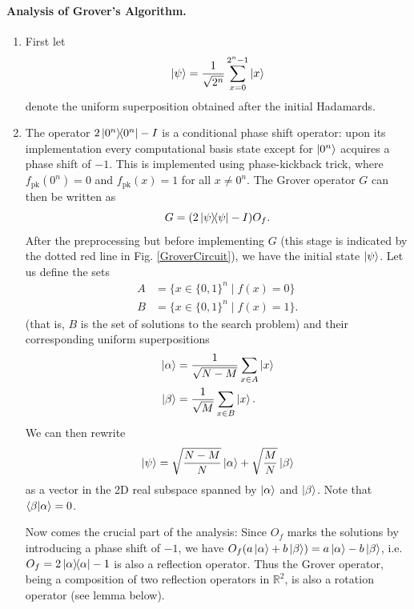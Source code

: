 \paragraph{Analysis of Grover's Algorithm.} 

\begin{enumerate}
    \item First let
    \[
        \ket{\psi}=\frac{1}{\sqrt{2^n}}\sum_{x=0}^{2^n-1}\ket{x}
    \]
    denote the uniform superposition obtained after the initial Hadamards.
    
    \item The operator $2\ketbra{0^n}{0^n}-I$ is a conditional phase shift operator: upon its implementation every computational basis state except for $\ket{0^n}$ acquires a phase shift of $-1$. This is implemented using phase-kickback trick, where $f_{\text{pk}}(0^n)=0$ and $f_{\text{pk}}(x)=1$ for all $x \neq 0^n$. The Grover operator $G$ can then be written as
    \[
        G = (2\ketbra{\psi}{\psi}-I)O_f.
    \]
    After the preprocessing but before implementing $G$ (this stage is indicated by the dotted red line in Fig. \ref{GroverCircuit}), we have the initial state $\ket{\psi}$. Let us define the sets 
    \begin{align*}
        A &= \{x \in \{0,1\}^n \;|\; f(x)=0\}\\
        B &= \{x \in \{0,1\}^n \;|\; f(x)=1\}.
    \end{align*}
    (that is, $B$ is the set of solutions to the search problem) and their corresponding uniform superpositions
    \begin{align*}
        \ket{\alpha} &= \frac{1}{\sqrt{N-M}} \sum_{x \in A} \ket{x}\\
        \ket{\beta} &= \frac{1}{\sqrt{M}} \sum_{x \in B} \ket{x}.
    \end{align*}
    We can then rewrite
    \[
        \ket{\psi} = \sqrt{\frac{N-M}{N}}\ket{\alpha} + \sqrt{\frac{M}{N}}\ket{\beta}  
    \]
    as a vector in the 2D real subspace spanned by $\ket{\alpha}$ and $\ket{\beta}$. Note that $\braket{\beta}{\alpha}=0$. 
    
    Now comes the crucial part of the analysis: Since $O_f$ marks the solutions by introducing a phase shift of $-1$, we have $O_f(a\ket{\alpha}+b\ket{\beta}) = a\ket{\alpha}-b\ket{\beta}$, i.e. $O_f = 2\ketbra{\alpha}{\alpha}-1$ is also a reflection operator. Thus the Grover operator, being a composition of two reflection operators in $\mathbb{R}^2$, is also a rotation operator (see lemma below).


\end{enumerate}
